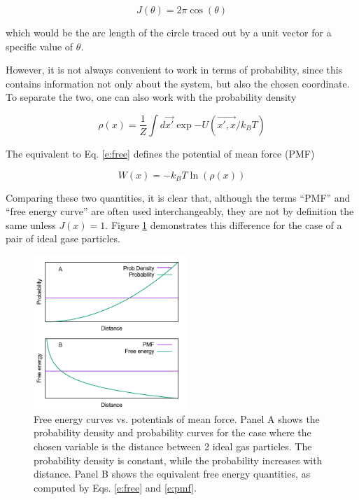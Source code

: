 \begin{equation}
J(\theta) = 2 \pi \cos(\theta)
\end{equation}

which would be the arc length of the circle traced out by a unit vector for a
specific value of $\theta$.

However, it is not always convenient to work in terms of probability, since this
contains information not only about the system, but also the chosen coordinate.
To separate the two, one can also work with the probability density

\begin{equation}
    \label{e:dens}
    \rho(x) = \frac{1}{Z} \int d\vec{x'} \exp{-U(\vec{x', x}/k_B T)}
\end{equation}

\noindent
The equivalent to Eq. \ref{e:free} defines the potential of mean force (PMF)

\begin{equation}
    \label{e:pmf}
    W(x) = - k_B T \ln(\rho(x))
\end{equation}

Comparing these two quantities, it is clear that, although the terms ``PMF'' and
``free energy curve'' are often used interchangeably, they are not by definition
the same unless $J(x)=1$.  Figure \ref{f:free} demonstrates this difference for the case of a pair of ideal gase particles.

\begin{figure}
    \includegraphics[width=5.8cm]{figures/ideal_gas/free}
    \caption{\label{f:free}
    Free energy curves vs. potentials of mean force.  Panel A shows the probability density and probability curves for the case where the chosen variable is the distance between 2 ideal gas particles.  The probability density is constant, while the probability increases with distance.  Panel B shows the equivalent free energy quantities, as computed by Eqs. \ref{e:free} and \ref{e:pmf}.
    }
\end{figure}
